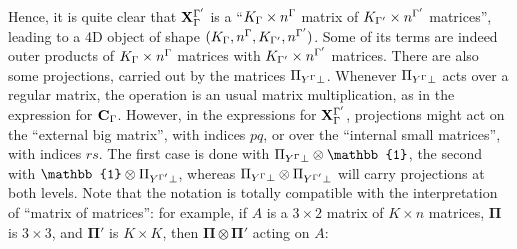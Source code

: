 Hence, it is quite clear that $\mathbf{X}_{\Gamma}^{\Gamma'}$ is a ``$K_{\Gamma} \times n^{\Gamma}$ matrix of $K_{\Gamma'} \times n^{\Gamma'}$ matrices'', leading to a 4D object of shape $(K_{\Gamma}, n^{\Gamma},K_{\Gamma'}, n^{\Gamma'})$.
Some of its terms are indeed outer products of $K_{\Gamma} \times n^{\Gamma}$ matrices with $K_{\Gamma'} \times n^{\Gamma'}$ matrices.
There are also some projections, carried out by the matrices $\Pi_{Y^{\Gamma} \perp}$.
Whenever $\Pi_{Y^{\Gamma} \perp}$ acts over a regular matrix, the operation is an usual matrix multiplication, as in the expression for $\mathbf{C}_{\Gamma}$.
However, in the expressions for $\mathbf{X}_{\Gamma}^{\Gamma'}$, projections might act on the ``external big matrix'', with indices $pq$, or over the ``internal small matrices'', with indices $rs$.
The first case is done with $\Pi_{Y^\irp \perp} \otimes \mathbb{1}$, the second with $\mathbb{1} \otimes \Pi_{Y^\irpP \perp}$, whereas $\Pi_{Y^{\Gamma} \perp} \otimes \Pi_{Y^{\Gamma'} \perp}$ will carry projections at both levels.
Note that the notation is totally compatible with the interpretation of ``matrix of matrices'':
for example, if $A$ is a $3 \times 2$ matrix of $K \times n$ matrices, $\mathbf{\Pi}$ is $3 \times 3$, and $\mathbf{\Pi}'$ is $K \times K$, then $\mathbf{\Pi} \otimes \mathbf{\Pi}'$ acting on $A$:
